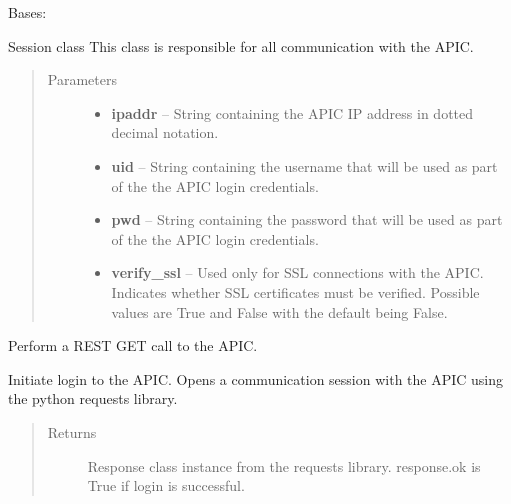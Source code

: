 \documentclass[letterpaper,10pt,english]{sphinxmanual}
\begin{document}
\begin{fulllineitems}
\label{acisession:acisession.Session}
Bases: 

Session class
This class is responsible for all communication with the APIC.
\begin{quote}\begin{description}
\item[{Parameters}] \leavevmode\begin{itemize}
\item {} 
\textbf{ipaddr} -- String containing the APIC IP address in dotted        decimal notation.

\item {} 
\textbf{uid} -- String containing the username that will be used as        part of the  the APIC login credentials.

\item {} 
\textbf{pwd} -- String containing the password that will be used as        part of the  the APIC login credentials.

\item {} 
\textbf{verify\_ssl} -- Used only for SSL connections with the APIC.        Indicates whether SSL certificates must be verified.  Possible        values are True and False with the default being False.

\end{itemize}

\end{description}\end{quote}

\begin{fulllineitems}
\label{acisession:acisession.Session.get}
Perform a REST GET call to the APIC.

\end{fulllineitems}


\begin{fulllineitems}
\label{acisession:acisession.Session.login}
Initiate login to the APIC.  Opens a communication session with the        APIC using the python requests library.
\begin{quote}\begin{description}
\item[{Returns}] \leavevmode
Response class instance from the requests library.        response.ok is True if login is successful.


\end{description}
\end{quote}
\end{fulllineitems}
\end{fulllineitems}
\end{document}
